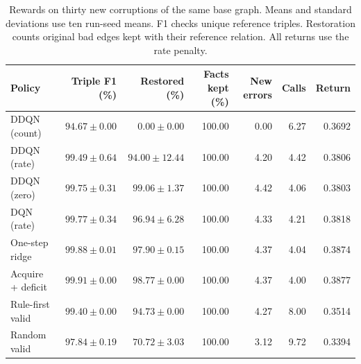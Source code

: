 \begin{table}[t]
\centering
\caption{Rewards on thirty new corruptions of the same base graph. Means and standard deviations use ten run-seed means. F1 checks unique reference triples. Restoration counts original bad edges kept with their reference relation. All returns use the rate penalty.}
\label{tab:reward_validation}
\footnotesize
\setlength{\tabcolsep}{3pt}
\begin{tabular*}{\textwidth}{@{\extracolsep{\fill}}lrrrrrr@{}}
\toprule
Policy & Triple F1 (\%) & Restored (\%) & Facts kept (\%) & New errors & Calls & Return \\
\midrule
DDQN (count) & $94.67\pm0.00$ & $0.00\pm0.00$ & 100.00 & 0.00 & 6.27 & 0.3692 \\
DDQN (rate) & $99.49\pm0.64$ & $94.00\pm12.44$ & 100.00 & 4.20 & 4.42 & 0.3806 \\
DDQN (zero) & $99.75\pm0.31$ & $99.06\pm1.37$ & 100.00 & 4.42 & 4.06 & 0.3803 \\
DQN (rate) & $99.77\pm0.34$ & $96.94\pm6.28$ & 100.00 & 4.33 & 4.21 & 0.3818 \\
One-step ridge & $99.88\pm0.01$ & $97.90\pm0.15$ & 100.00 & 4.37 & 4.04 & 0.3874 \\
Acquire + deficit & $99.91\pm0.00$ & $98.77\pm0.00$ & 100.00 & 4.37 & 4.00 & 0.3877 \\
Rule-first valid & $99.40\pm0.00$ & $94.73\pm0.00$ & 100.00 & 4.27 & 8.00 & 0.3514 \\
Random valid & $97.84\pm0.19$ & $70.72\pm3.03$ & 100.00 & 3.12 & 9.72 & 0.3394 \\
\bottomrule
\end{tabular*}
\end{table}
